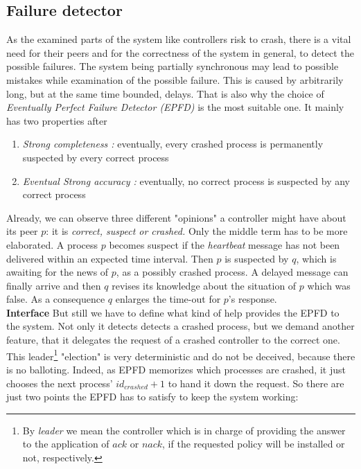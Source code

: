 \documentclass{article}
\theoremstyle{remark}
\begin{document}
\subsection{Failure detector}
As the examined parts of the system like controllers risk to crash, there is a vital need for their peers and for the correctness of the system in general, to detect the possible failures. The system being partially synchronous may lead to possible mistakes while examination of the possible failure. This is caused by arbitrarily long, but at the same time bounded, delays.
That is also why the choice of \emph{Eventually Perfect Failure Detector (EPFD)} is the most suitable one. It mainly has two properties after \cite{Guerraoui:2010:IRD:1951643}
\begin{enumerate}
\item \emph{Strong completeness :} eventually, every crashed process is permanently suspected by every correct process
\item  \emph{Eventual Strong accuracy :} eventually, no correct process is suspected by any correct process
\end{enumerate}
Already, we can observe three different "opinions" a controller might have about its peer $p$: it is \emph{correct, suspect or crashed.} Only the middle term has to be more elaborated. A process $p$ becomes suspect if the \emph{heartbeat} message has not been delivered within an expected time interval. Then $p$ is suspected by $q$, which is awaiting for the news of $p$, as a possibly crashed process. A delayed message can finally arrive and then $q$ revises its knowledge about the situation of $p$ which was false. As a consequence $q$ enlarges the time-out for $p$'s response.\\
\textbf{Interface} But still we have to define what kind of help provides the EPFD to the system. Not only it detects detects a crashed process, but we demand another feature, that it delegates the request of a crashed controller to the correct one. This leader\footnote{By \emph{leader} we mean the controller which is in charge of providing the answer to the application of  $ack$ or $nack$, if the requested policy will be installed or not, respectively.} "election" is  very deterministic and do not be deceived, because there is no balloting. Indeed, as EPFD memorizes which processes are crashed, it just chooses the next process' $id_{crashed}+1$ to hand it down the request. So there are just two points the EPFD has to satisfy to keep the system working:
\end{document}
